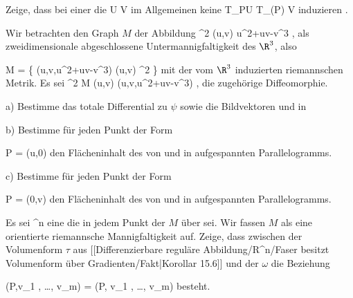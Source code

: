 {}
{

Zeige, dass bei einer
die
\maabbdisp {\alpha} { U } { V
} {}
im Allgemeinen keine
 {T_PU} {T_{\alpha(P)} V
} {}
induzieren
 {} {.}

}
{} {}

{}
{

Wir betrachten den Graph $M$ der Abbildung
\maabbeledisp {\varphi} {\R^2} {\R
} {(u,v)} { u^2+uv-v^3
} {,} als zweidimensionale abgeschlossene Untermannigfaltigkeit des $\R^3$, also

\mavergleichskettedisp
{\vergleichskette
{ M
}
{ =} { \left\{ (u,v,u^2+uv-v^3)  \mid  (u,v) \in \R^2         \right\}
}
{ } {
}
{ } {
}
{ } {
}
}
{}{}{}
mit der vom $\R^3$ induzierten riemannschen Metrik. Es sei
\maabbeledisp {\psi} {\R^2} { M
} {(u,v)} { (u,v,u^2+uv-v^3)
} {,}
die zugehörige Diffeomorphie.

a) Bestimme das totale Differential zu $\psi$ sowie die Bildvektoren
 und
 in

b) Bestimme für jeden Punkt der Form

\mavergleichskette
{\vergleichskette
{ P
}
{ = }{ (u,0)
}
{  }{
}
{    }{
}
{   }{
}
}
{}{}{}
den Flächeninhalt des von
 und
 in
 aufgespannten Parallelogramms.

c) Bestimme für jeden Punkt der Form

\mavergleichskette
{\vergleichskette
{ P
}
{ = }{ (0,v)
}
{  }{
}
{    }{
}
{   }{
}
}
{}{}{}
den Flächeninhalt des von
 und
 in
 aufgespannten Parallelogramms.

}
{} {}

{}
{

Es sei
\maabbdisp {\varphi} {\R^n } {\R
} {}
 {} {}
eine
die in jedem Punkt der
$M$ über
\mathl{0 \in \R}{}
sei. Wir fassen $M$ als eine orientierte riemannsche Mannigfaltigkeit auf. Zeige, dass zwischen der Volumenform $\tau$ aus
[[Differenzierbare reguläre Abbildung/R^n/Faser besitzt Volumenform über Gradienten/Fakt|Korollar 15.6]]
und der
$\omega$ die Beziehung

\mavergleichskettedisp
{\vergleichskette
{\tau(P,v_1 , \ldots , v_m)
}
{ =} { \pm {} \Vert  \omega(P, v_1 , \ldots , v_m)
}
{ } {
}
{ } {
}
{ } {
}
}
{}{}{}
besteht.

}
{} {}

